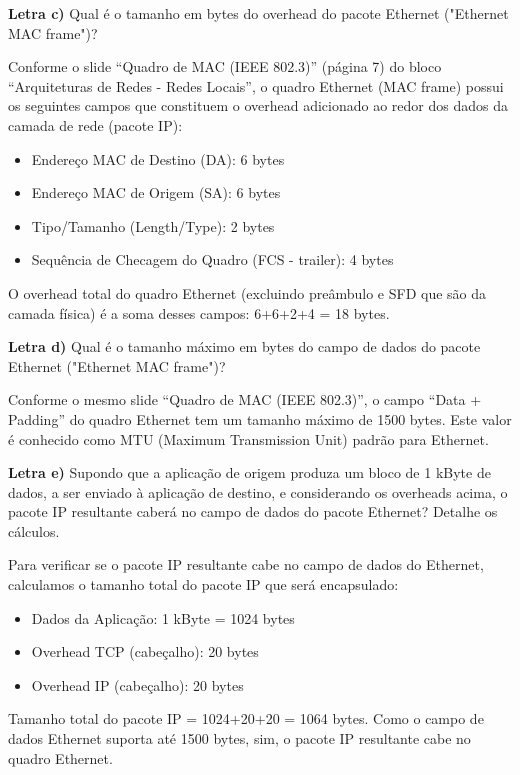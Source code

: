 \documentclass[12pt]{article}
\begin{document}
\begin{titlepage}
\textbf{Letra c)} Qual é o tamanho em bytes do overhead do pacote Ethernet ("Ethernet MAC frame")?

Conforme o slide “Quadro de MAC (IEEE 802.3)” (página 7) do bloco “Arquiteturas de Redes - Redes Locais”, o quadro Ethernet (MAC frame) possui os seguintes campos que constituem o overhead adicionado ao redor dos dados da camada de rede (pacote IP):

\begin{itemize}
    \item Endereço MAC de Destino (DA): 6 bytes
    \item Endereço MAC de Origem (SA): 6 bytes
    \item Tipo/Tamanho (Length/Type): 2 bytes
    \item Sequência de Checagem do Quadro (FCS - trailer): 4 bytes
\end{itemize}

O overhead total do quadro Ethernet (excluindo preâmbulo e SFD que são da camada física) é a soma desses campos: 6+6+2+4 = 18 bytes.

\textbf{Letra d)} Qual é o tamanho máximo em bytes do campo de dados do pacote Ethernet ("Ethernet MAC frame")?

Conforme o mesmo slide “Quadro de MAC (IEEE 802.3)”, o campo “Data + Padding” do quadro Ethernet tem um tamanho máximo de 1500 bytes. Este valor é conhecido como MTU (Maximum Transmission Unit) padrão para Ethernet.

\textbf{Letra e)} Supondo que a aplicação de origem produza um bloco de 1 kByte de dados, a ser enviado à aplicação de destino, e considerando os overheads acima, o pacote IP resultante caberá no campo de dados do pacote Ethernet? Detalhe os cálculos.

Para verificar se o pacote IP resultante cabe no campo de dados do Ethernet, calculamos o tamanho total do pacote IP que será encapsulado:

\begin{itemize}
    \item Dados da Aplicação: 1 kByte = 1024 bytes
    \item Overhead TCP (cabeçalho): 20 bytes
    \item Overhead IP (cabeçalho): 20 bytes
\end{itemize}

Tamanho total do pacote IP = 1024+20+20 = 1064 bytes. Como o campo de dados Ethernet suporta até 1500 bytes, sim, o pacote IP resultante cabe no quadro Ethernet.


\end{titlepage}
\end{document}
